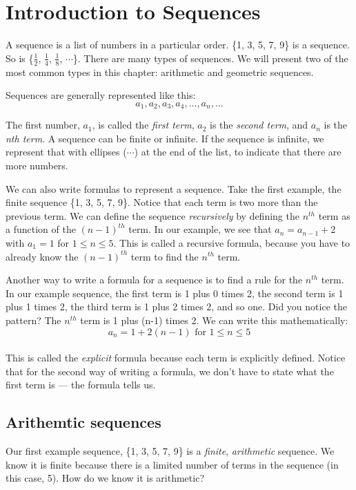 \chapter{Introduction to Sequences}

A sequence is a list of numbers in a particular order. \{1, 3, 5, 7, 
9\} is a sequence. So is \{$\frac{1}{2}$, $\frac{1}{4}$, $\frac{1}{8}$, 
$\cdots$\}. There are many types of sequences. We will present two of 
the most common types in this chapter: arithmetic and geometric 
sequences. 

Sequences are generally represented like this:
$$a_1, a_2, a_3, a_4,...,a_n,...$$

The first number, $a_1$, is called the \textit{first term}, $a_2$ is 
the \textit{second term}, and $a_n$ is the \textit{nth term}. A 
sequence can be finite or infinite. If the sequence is infinite, we 
represent that with ellipses ($\cdots$) at the end of the list, to 
indicate that there are more numbers. 

We can also write formulas to represent a sequence. Take the first 
example, the finite sequence \{1, 3, 5, 7, 9\}. Notice that each term 
is two more than the previous term. We can define the sequence 
\textit{recursively} by defining the $n^{th}$ term as a function of 
the $(n-1)^{th}$ term. In our example, we see that $a_n = a_{n-1}+2$ 
with $a_1 = 1$ for $1 \leq n \leq 5$. This is called a recursive 
formula, because you have to already know the $(n-1)^{th}$ term to 
find the $n^{th}$ term. 

Another way to write a formula for a sequence is to find a rule for 
the $n^{th}$ term. In our example sequence, the first term is 1 plus 
0 times 2, the second term is 1 plus 1 times 2, the third term is 1 
plus 2 times 2, and so one. Did you notice the pattern? The $n^{th}$ 
term is 1 plus (n-1) times 2. We can write this mathematically: $$a_n 
= 1 + 2(n-1)\text{ for } 1 \leq n \leq 5$$\\ 
This is called the \textit{explicit} formula because each term is 
explicitly defined. Notice that for the second way of writing a formula, 
we don't have to state what the first term is --- the formula tells us. 

\section{Arithemtic sequences}
Our first example sequence, \{1, 3, 5, 7, 9\} is a \textit{finite}, 
\textit{arithmetic} sequence. We know it is finite because there is a 
limited number of terms in the sequence (in this case, 5). How do we 
know it is arithmetic?

